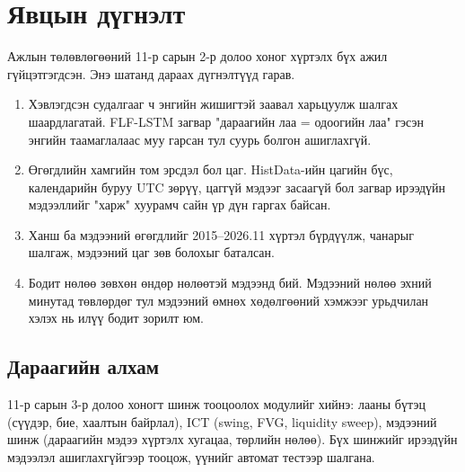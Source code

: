 \chapter{Явцын дүгнэлт}
\label{ch:conclusion}

Ажлын төлөвлөгөөний 11-р сарын 2-р долоо хоног хүртэлх бүх ажил гүйцэтгэгдсэн. Энэ шатанд дараах дүгнэлтүүд гарав.
\begin{enumerate}
    \item Хэвлэгдсэн судалгааг ч энгийн жишигтэй заавал харьцуулж шалгах шаардлагатай. FLF-LSTM загвар
          "дараагийн лаа = одоогийн лаа" гэсэн энгийн таамаглалаас муу гарсан тул суурь болгон ашиглахгүй.
    \item Өгөгдлийн хамгийн том эрсдэл бол цаг. HistData-ийн цагийн бүс, календарийн буруу UTC зөрүү, цаггүй мэдээг
          засаагүй бол загвар ирээдүйн мэдээллийг "харж" хуурамч сайн үр дүн гаргах байсан.
    \item Ханш ба мэдээний өгөгдлийг 2015--2026.11 хүртэл бүрдүүлж, чанарыг шалгаж, мэдээний цаг зөв болохыг баталсан.
    \item Бодит нөлөө зөвхөн өндөр нөлөөтэй мэдээнд бий. Мэдээний нөлөө эхний минутад төвлөрдөг тул мэдээний өмнөх
          хөдөлгөөний хэмжээг урьдчилан хэлэх нь илүү бодит зорилт юм.
\end{enumerate}

\section*{Дараагийн алхам}
11-р сарын 3-р долоо хоногт шинж тооцоолох модулийг хийнэ: лааны бүтэц (сүүдэр, бие, хаалтын байрлал), ICT (swing,
FVG, liquidity sweep), мэдээний шинж (дараагийн мэдээ хүртэлх хугацаа, төрлийн нөлөө). Бүх шинжийг ирээдүйн мэдээлэл
ашиглахгүйгээр тооцож, үүнийг автомат тестээр шалгана.
